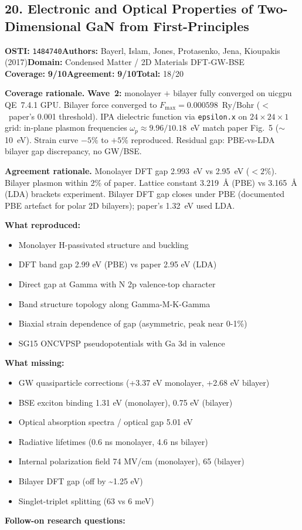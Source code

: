 \documentclass[11pt]{article}
\newcommand{\scorebadge}[2]{\textbf{#1:} \textbf{#2/10}}
\begin{document}
\subsection{20. Electronic and Optical Properties of Two-Dimensional GaN from First-Principles}
\textbf{OSTI:} \texttt{1484740}\quad\textbf{Authors:} Bayerl, Islam, Jones, Protasenko, Jena, Kioupakis (2017)\quad\textbf{Domain:} Condensed Matter / 2D Materials DFT-GW-BSE\\
\scorebadge{Coverage}{9}\quad\scorebadge{Agreement}{9}\quad\textbf{Total:} 18/20\par\smallskip
\noindent\textbf{Coverage rationale.} \textbf{Wave~2:} monolayer $+$ bilayer fully converged on uicgpu QE~7.4.1 GPU. Bilayer force converged to $F_{\max}=0.000598$~Ry/Bohr ($<$~paper's 0.001 threshold). IPA dielectric function via \texttt{epsilon.x} on $24\times24\times1$ grid: in-plane plasmon frequencies $\omega_p \approx 9.96/10.18$~eV match paper Fig.~5 ($\sim$10~eV). Strain curve $-5\%$ to $+5\%$ reproduced. Residual gap: PBE-vs-LDA bilayer gap discrepancy, no GW/BSE.\par
\noindent\textbf{Agreement rationale.} Monolayer DFT gap 2.993~eV vs 2.95~eV ($<2\%$). Bilayer plasmon within 2\% of paper. Lattice constant 3.219~\AA{} (PBE) vs 3.165~\AA{} (LDA) brackets experiment. Bilayer DFT gap closes under PBE (documented PBE artefact for polar 2D bilayers); paper's 1.32~eV used LDA.\par\smallskip
\noindent\textbf{What reproduced:}
\begin{itemize}[leftmargin=1.4em,itemsep=0.2em,topsep=0.2em]
\item Monolayer H-passivated structure and buckling
\item DFT band gap 2.99 eV (PBE) vs paper 2.95 eV (LDA)
\item Direct gap at Gamma with N 2p valence-top character
\item Band structure topology along Gamma-M-K-Gamma
\item Biaxial strain dependence of gap (asymmetric, peak near 0-1\%)
\item SG15 ONCVPSP pseudopotentials with Ga 3d in valence
\end{itemize}\noindent\textbf{What missing:}
\begin{itemize}[leftmargin=1.4em,itemsep=0.2em,topsep=0.2em]
\item GW quasiparticle corrections (+3.37 eV monolayer, +2.68 eV bilayer)
\item BSE exciton binding 1.31 eV (monolayer), 0.75 eV (bilayer)
\item Optical absorption spectra / optical gap 5.01 eV
\item Radiative lifetimes (0.6 ns monolayer, 4.6 ns bilayer)
\item Internal polarization field 74 MV/cm (monolayer), 65 (bilayer)
\item Bilayer DFT gap (off by \textasciitilde{}1.25 eV)
\item Singlet-triplet splitting (63 vs 6 meV)
\end{itemize}\noindent\textbf{Follow-on research questions:}
\end{document}
